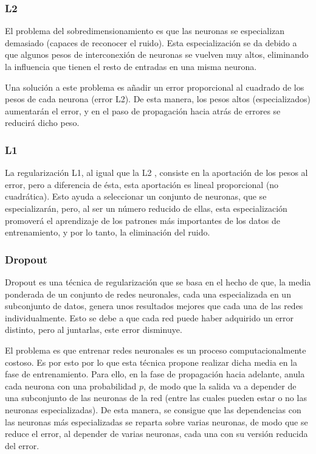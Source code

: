 \subsubsection{L2}
El problema del sobredimensionamiento es que las neuronas se especializan demasiado (capaces de reconocer el ruido). Esta especialización se da debido a que algunos pesos de interconexión de neuronas se vuelven muy altos, eliminando la influencia que tienen el resto de entradas en una misma neurona.

Una solución a este problema es añadir un error proporcional al cuadrado de los pesos de cada neurona (error L2). De esta manera, los pesos altos (especializados) aumentarán el error, y en el paso de propagación hacia atrás de errores se reducirá dicho peso.
\subsubsection{L1}
La regularización L1, al igual que la L2 \cite{ng2004feature}, consiste en la aportación de los pesos al error, pero a diferencia de ésta, esta aportación es lineal proporcional (no cuadrática). Esto ayuda a seleccionar un conjunto de neuronas, que se especializarán, pero, al ser un número reducido de ellas, esta especialización promoverá el aprendizaje de los patrones más importantes de los datos de entrenamiento, y por lo tanto, la eliminación del ruido.
\subsubsection{Dropout}
Dropout \cite{gal2015theoretically} es una técnica de regularización que se basa en el hecho de que, la media ponderada de un conjunto de redes neuronales, cada una especializada en un subconjunto de datos, genera unos resultados mejores que cada una de las redes individualmente. Esto se debe a que cada red puede haber adquirido un error distinto, pero al juntarlas, este error disminuye.

El problema es que entrenar redes neuronales es un proceso computacionalmente costoso. Es por esto por lo que esta técnica propone realizar dicha media en la fase de entrenamiento. Para ello, en la fase de propagación hacia adelante, anula cada neurona con una probabilidad $p$, de modo que la salida va a depender de una subconjunto de las neuronas de la red (entre las cuales pueden estar o no las neuronas especializadas). De esta manera, se consigue que las dependencias con las neuronas más especializadas se reparta sobre varias neuronas, de modo que se reduce el error, al depender de varias neuronas, cada una con su versión reducida del error.
